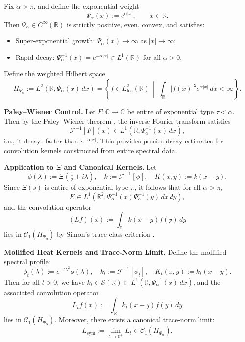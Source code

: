 \begin{definition}\label{def:exponential_weight}
Fix \( \alpha > \pi \), and define the exponential weight
\[
\Psi_\alpha(x) := e^{\alpha |x|}, \qquad x \in \mathbb{R}.
\]
Then \( \Psi_\alpha \in C^\infty(\mathbb{R}) \) is strictly positive, even, convex, and satisfies:
\begin{itemize}
    \item Super-exponential growth: \( \Psi_\alpha(x) \to \infty \) as \( |x| \to \infty \);
    \item Rapid decay: \( \Psi_\alpha^{-1}(x) = e^{-\alpha |x|} \in L^1(\mathbb{R}) \) for all \( \alpha > 0 \).
\end{itemize}

Define the weighted Hilbert space
\[
H_{\Psi_\alpha} := L^2(\mathbb{R}, \Psi_\alpha(x)\, dx) = \left\{ f \in L^2_{\mathrm{loc}}(\mathbb{R}) \ \middle|\ \int_{\mathbb{R}} |f(x)|^2 e^{\alpha |x|}\, dx < \infty \right\}.
\]

\medskip
\noindent\textbf{Paley–Wiener Control.}
Let \( F \colon \mathbb{C} \to \mathbb{C} \) be entire of exponential type \( \tau < \alpha \). Then by the Paley–Wiener theorem \cite[Thm.~3.2.4]{Levin1996EntireLectures}, the inverse Fourier transform satisfies
\[
\mathscr{F}^{-1}[F](x) \in L^1(\mathbb{R}, \Psi_\alpha^{-1}(x)\, dx),
\]
i.e., it decays faster than \( e^{-\alpha |x|} \). This provides precise decay estimates for convolution kernels constructed from entire spectral data.

\medskip
\noindent\textbf{Application to \(\Xi\) and Canonical Kernels.}
Let
\[
\phi(\lambda) := \Xi\left( \tfrac{1}{2} + i\lambda \right), \quad
k := \mathscr{F}^{-1}[\phi], \quad
K(x,y) := k(x - y).
\]
Since \( \Xi(s) \) is entire of exponential type \( \pi \), it follows that for all \( \alpha > \pi \),
\[
K \in L^1(\mathbb{R}^2, \Psi_\alpha^{-1}(x)\Psi_\alpha^{-1}(y)\, dx\,dy),
\]
and the convolution operator
\[
(Lf)(x) := \int_{\mathbb{R}} k(x - y) f(y)\, dy
\]
lies in \( \mathcal{C}_1(H_{\Psi_\alpha}) \) by Simon's trace-class criterion \cite[Thm.~4.2]{Simon2005TraceIdeals}.

\medskip
\noindent\textbf{Mollified Heat Kernels and Trace-Norm Limit.}
Define the mollified spectral profile:
\[
\phi_t(\lambda) := e^{-t\lambda^2} \phi(\lambda), \quad
k_t := \mathscr{F}^{-1}[\phi_t], \quad
K_t(x,y) := k_t(x - y).
\]
Then for all \( t > 0 \), we have \( k_t \in \mathcal{S}(\mathbb{R}) \subset L^1(\mathbb{R}, \Psi_\alpha^{-1}(x)\, dx) \), and the associated convolution operator
\[
L_t f(x) := \int_{\mathbb{R}} k_t(x - y) f(y)\, dy
\]
lies in \( \mathcal{C}_1(H_{\Psi_\alpha}) \). Moreover, there exists a canonical trace-norm limit:
\[
L_{\mathrm{sym}} := \lim_{t \to 0^+} L_t \in \mathcal{C}_1(H_{\Psi_\alpha}).
\]


\end{definition}
